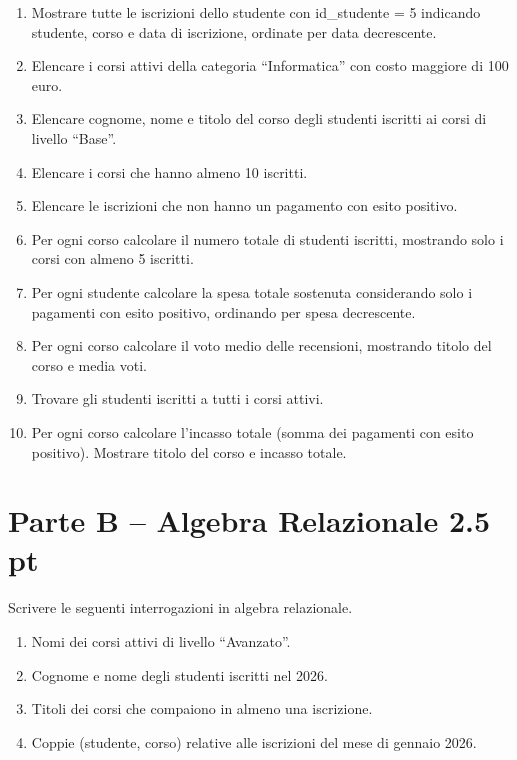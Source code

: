 \documentclass[a4paper,12pt]{article}
\begin{document}
	\begin{enumerate}
		\item Mostrare tutte le iscrizioni dello studente con id\_studente = 5 indicando studente, corso e data di iscrizione, ordinate per data decrescente.
		
		\item Elencare i corsi attivi della categoria ``Informatica'' con costo maggiore di 100 euro.
		
		\item Elencare cognome, nome e titolo del corso degli studenti iscritti ai corsi di livello ``Base''.
		
		\item Elencare i corsi che hanno almeno 10 iscritti.
		
		\item Elencare le iscrizioni che non hanno un pagamento con esito positivo.
		
		\item Per ogni corso calcolare il numero totale di studenti iscritti, mostrando solo i corsi con almeno 5 iscritti.
		
		\item Per ogni studente calcolare la spesa totale sostenuta considerando solo i pagamenti con esito positivo, ordinando per spesa decrescente.
		
		\item Per ogni corso calcolare il voto medio delle recensioni, mostrando titolo del corso e media voti.
		
		\item Trovare gli studenti iscritti a tutti i corsi attivi.
		
		\item Per ogni corso calcolare l'incasso totale (somma dei pagamenti con esito positivo). Mostrare titolo del corso e incasso totale.
	\end{enumerate}
	
	\section*{Parte B -- Algebra Relazionale 2.5 pt}
	
	Scrivere le seguenti interrogazioni in algebra relazionale.
	
	\begin{enumerate}
		\item Nomi dei corsi attivi di livello ``Avanzato''.
		\item Cognome e nome degli studenti iscritti nel 2026.
		\item Titoli dei corsi che compaiono in almeno una iscrizione.
		\item Coppie (studente, corso) relative alle iscrizioni del mese di gennaio 2026.
	\end{enumerate}
	
\end{document}
